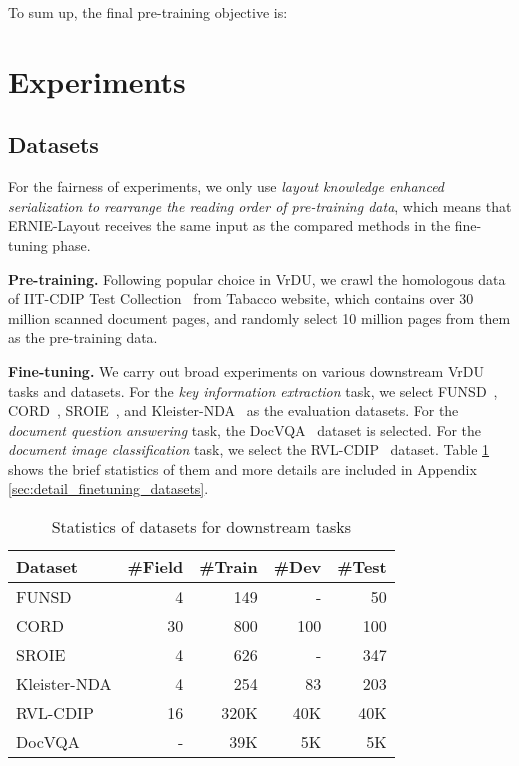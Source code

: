 \documentclass[11pt]{article}
\begin{document}
To sum up, the final pre-training objective is:





\section{Experiments}

\subsection{Datasets}

For the fairness of experiments, we only use \emph{layout knowledge enhanced serialization to rearrange the reading order of pre-training data}, which means that ERNIE-Layout receives the same input as the compared methods in the fine-tuning phase.

\noindent\textbf{Pre-training.}
Following popular choice in VrDU, we crawl the homologous data of IIT-CDIP Test Collection~\cite{lewis2006building} from Tabacco website, which contains over 30 million scanned document pages, and randomly select 10 million pages from them as the pre-training data. 

\noindent\textbf{Fine-tuning.}
We carry out broad experiments on various downstream VrDU tasks and datasets.
For the \emph{key information extraction} task, we select FUNSD~\cite{jain2019multimodal}, CORD~\cite{park2019cord}, SROIE~\cite{huang2019icdar2019}, and Kleister-NDA~\cite{gralinski2021kleister} as the evaluation datasets.
For the \emph{document question answering} task, the DocVQA~\cite{mathew2021docvqa} dataset is selected.
For the \emph{document image classification} task, we select the RVL-CDIP~\cite{harley2015evaluation} dataset.
Table \ref{tab:statistics_of_fine_tuning_datasets} shows the brief statistics of them and more details are included in Appendix \ref{sec:detail_finetuning_datasets}.


\begin{table}[t]
\centering
\small
\begin{tabular}{lrrrr}
\toprule
\textbf{Dataset} & \textbf{\#Field} & \textbf{\#Train} & \textbf{\#Dev} & \textbf{\#Test} \\
\midrule
FUNSD & 4 & 149 & - & 50 \\
CORD & 30 & 800 & 100 & 100 \\
SROIE & 4 & 626 & - & 347 \\ 
Kleister-NDA & 4 & 254 & 83 & 203 \\
RVL-CDIP & 16 & 320K & 40K & 40K \\
DocVQA & - & 39K & 5K & 5K \\ 
\bottomrule
\end{tabular}
\caption{Statistics of datasets for downstream tasks}
\label{tab:statistics_of_fine_tuning_datasets}
\end{table}
\end{document}
